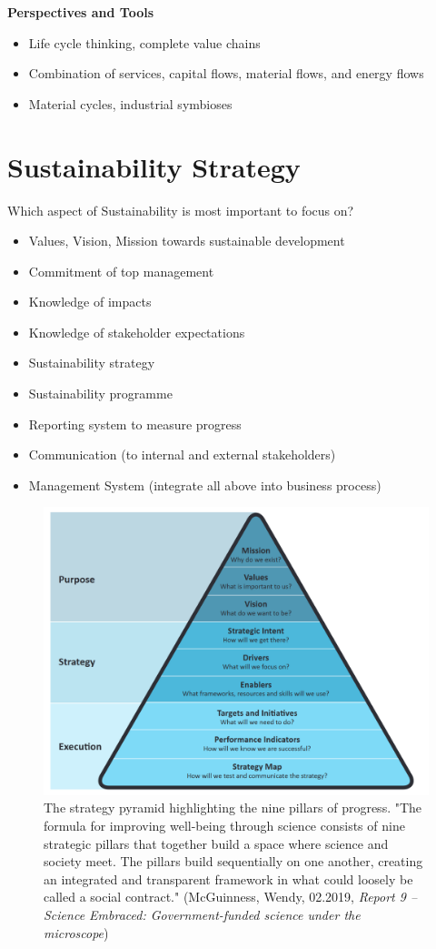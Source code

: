\documentclass[11pt]{article}
\theoremstyle{definition}
\begin{document}
\vspace*{1em}
\noindent
\textbf{Perspectives and Tools}
\begin{itemize}
	\item Life cycle thinking, complete value chains
	\item Combination of services, capital flows, material flows, and energy flows
	\item Material cycles, industrial symbioses
\end{itemize}

\section{Sustainability Strategy}
Which aspect of Sustainability is most important to focus on?
\begin{itemize}
	\item Values, Vision, Mission towards sustainable development
	\item Commitment of top management
	\item Knowledge of impacts
	\item Knowledge of stakeholder expectations
	\item Sustainability strategy
	\item Sustainability programme
	\item Reporting system to measure progress
	\item Communication (to internal and external stakeholders)
	\item Management System (integrate all above into business process)
\end{itemize}

\begin{figure}[H]
	\centering
	\includegraphics[width=0.6\linewidth]{img/strategy_map}
	\caption{The strategy pyramid highlighting the nine pillars of progress. "The formula for improving well-being through science consists of nine strategic pillars that together build a space where science and society meet. The pillars build sequentially on one another, creating an integrated and transparent framework in what could loosely be called a social contract." (McGuinness, Wendy, 02.2019, \textit{Report 9 – Science Embraced: Government-funded science under the microscope})}
	\label{fig:strategymap}
\end{figure}
\end{document}
